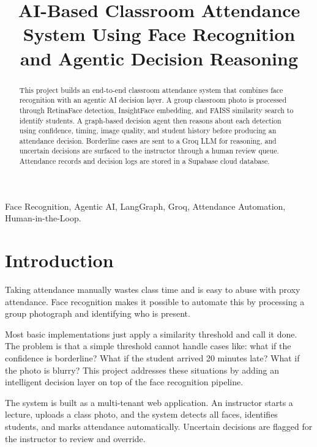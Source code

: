 \documentclass[conference]{IEEEtran}
\begin{document}
\title{AI-Based Classroom Attendance System Using Face Recognition and Agentic Decision Reasoning}

\author{
}

\maketitle

\begin{abstract}
This project builds an end-to-end classroom attendance system that combines face recognition with an agentic AI decision layer. A group classroom photo is processed through RetinaFace detection, InsightFace embedding, and FAISS similarity search to identify students. A graph-based decision agent then reasons about each detection using confidence, timing, image quality, and student history before producing an attendance decision. Borderline cases are sent to a Groq LLM for reasoning, and uncertain decisions are surfaced to the instructor through a human review queue. Attendance records and decision logs are stored in a Supabase cloud database.
\end{abstract}

\begin{IEEEkeywords}
Face Recognition, Agentic AI, LangGraph, Groq, Attendance Automation, Human-in-the-Loop.
\end{IEEEkeywords}

\section{Introduction}

Taking attendance manually wastes class time and is easy to abuse with proxy attendance. Face recognition makes it possible to automate this by processing a group photograph and identifying who is present.

Most basic implementations just apply a similarity threshold and call it done. The problem is that a simple threshold cannot handle cases like: what if the confidence is borderline? What if the student arrived 20 minutes late? What if the photo is blurry? This project addresses these situations by adding an intelligent decision layer on top of the face recognition pipeline.

The system is built as a multi-tenant web application. An instructor starts a lecture, uploads a class photo, and the system detects all faces, identifies students, and marks attendance automatically. Uncertain decisions are flagged for the instructor to review and override.
\end{document}
